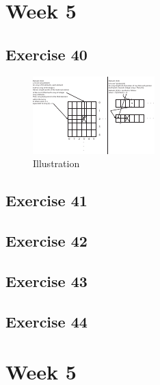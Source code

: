 \documentclass[a4paper]{article}
\let\stdsection\section
\renewcommand\section{\newpage\stdsection}
\begin{document}
\section*{Week 5}

\subsection*{Exercise 40}

\begin{figure}[H]
\centerline{\includegraphics[trim={0 0cm 0 0cm}, scale=5]{../40/illustration.pdf}}
\caption{Illustration}
\end{figure}

\newpage
\subsection*{Exercise 41}


\newpage
\subsection*{Exercise 42}

\newpage
\subsection*{Exercise 43}


\newpage
\subsection*{Exercise 44}






\section*{Week 5}
\end{document}
